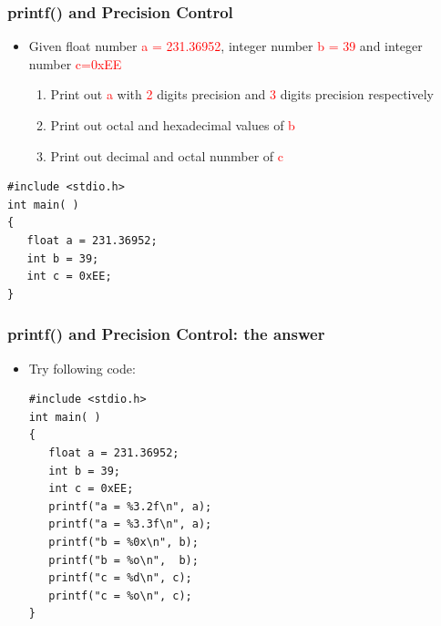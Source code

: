 \begin{frame}[fragile]
\frametitle{printf() and Precision Control}
\begin{itemize}
	\item {Given float number \textcolor{red}{a = 231.36952}, integer number \textcolor{red}{b = 39} and integer number \textcolor{red}{c=0xEE}}
	\begin{enumerate}
		\item{Print out \textcolor{red}{a} with \textcolor{red}{2} digits precision and \textcolor{red}{3} digits precision respectively}
		\item{Print out octal and hexadecimal values of \textcolor{red}{b}}
		\item{Print out decimal and octal nunmber of \textcolor{red}{c}}
	\end{enumerate}
\end{itemize}

\begin{lstlisting}[xleftmargin=0.08\linewidth, linewidth=0.9\linewidth]
#include <stdio.h>
int main( )
{
   float a = 231.36952;
   int b = 39;
   int c = 0xEE;
}
\end{lstlisting}
\end{frame}

\ifx\answer\undefined
\begin{frame}[fragile]
\frametitle{printf() and Precision Control: the answer}
\begin{itemize}
	\item {Try following code:}
	\begin{lstlisting}[xleftmargin=0.08\linewidth, linewidth=0.9\linewidth]
#include <stdio.h>
int main( )
{
   float a = 231.36952;
   int b = 39;
   int c = 0xEE;
   printf("a = %3.2f\n", a);
   printf("a = %3.3f\n", a);
   printf("b = %0x\n", b);
   printf("b = %o\n",  b);
   printf("c = %d\n", c);
   printf("c = %o\n", c);
}
	\end{lstlisting}
\end{itemize}
\end{frame}
\fi

